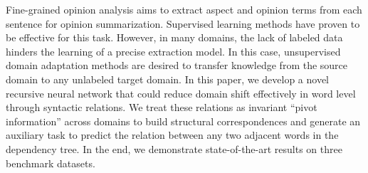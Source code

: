Fine-grained opinion analysis aims to extract aspect and opinion terms from each sentence for opinion summarization. Supervised learning methods have proven to be effective for this task. However, in many domains, the lack of labeled data hinders the learning of a precise extraction model. In this case, unsupervised domain adaptation methods are desired to transfer knowledge from the source domain to any unlabeled target domain. In this paper, we develop a novel recursive neural network that could reduce domain shift effectively in word level through syntactic relations. We treat these relations as invariant ``pivot information'' across domains to build structural correspondences and generate an auxiliary task to predict the relation between any two adjacent words in the dependency tree. In the end, we demonstrate state-of-the-art results on three benchmark datasets.
